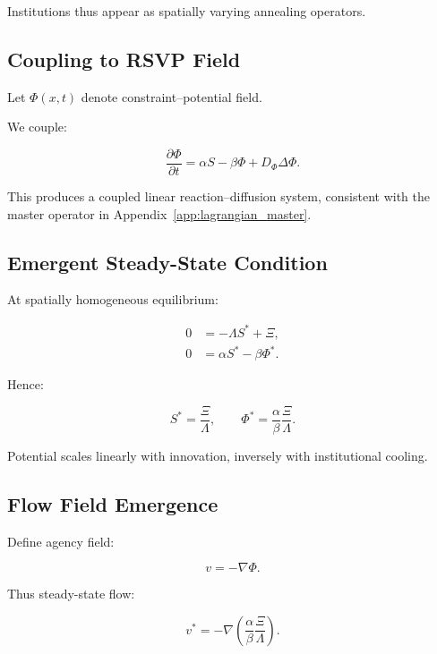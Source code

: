 \documentclass[12pt,a4paper]{article}
\theoremstyle{definition}
\begin{document}
Institutions thus appear as spatially varying annealing operators.

\subsection{Coupling to RSVP Field}

Let $\Phi(x,t)$ denote constraint–potential field.

We couple:

\begin{equation}
  \frac{\partial \Phi}{\partial t}
  =
  \alpha S
  - \beta \Phi
  + D_\Phi \Delta \Phi.
  \label{eq:phi_coupled}
\end{equation}

This produces a coupled linear reaction–diffusion system,
consistent with the master operator in Appendix~\ref{app:lagrangian_master}.

\subsection{Emergent Steady-State Condition}

At spatially homogeneous equilibrium:

\begin{align}
  0 &= -\Lambda S^* + \Xi, \\
  0 &= \alpha S^* - \beta \Phi^*.
\end{align}

Hence:

\begin{equation}
  S^* = \frac{\Xi}{\Lambda},
  \qquad
  \Phi^* = \frac{\alpha}{\beta}
  \frac{\Xi}{\Lambda}.
  \label{eq:steady_micro_macro}
\end{equation}

Potential scales linearly with innovation,
inversely with institutional cooling.

\subsection{Flow Field Emergence}

Define agency field:

\begin{equation}
  v = -\nabla \Phi.
\end{equation}

Thus steady-state flow:

\begin{equation}
  v^* =
  - \nabla
  \left(
  \frac{\alpha}{\beta}
  \frac{\Xi}{\Lambda}
  \right).
\end{equation}
\end{document}
